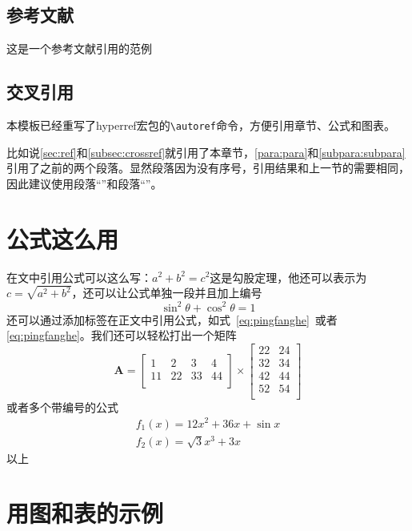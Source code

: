 \documentclass[supercite]{HustGraduPaper}
\begin{document}
\subsection{参考文献}
这是一个参考文献引用的范例\cite{Renzo2019,5502350, liang2019large, CHN_zhou2020, CHN_zhang2017}




\subsection{交叉引用}\label{subsec:crossref}
本模板已经重写了hyperref宏包的\verb|\autoref|命令，方便引用章节、公式和图表。

比如说\autoref{sec:ref}和\autoref{subsec:crossref}就引用了本章节，\autoref{para:para}和\autoref{subpara:subpara}引用了之前的两个段落。显然段落因为没有序号，引用结果和上一节的需要相同，因此建议使用段落“”和段落“”。

\section{公式这么用}
在文中引用公式可以这么写：$a^2+b^2=c^2$这是勾股定理，他还可以表示为$c=\sqrt{a^2+b^2}$，还可以让公式单独一段并且加上编号
\begin{equation}
	\sin^2{\theta}+\cos^2{\theta}=1 \label{eq:pingfanghe}
\end{equation}
还可以通过添加标签在正文中引用公式，如式~\eqref{eq:pingfanghe}~或者\autoref{eq:pingfanghe}。我们还可以轻松打出一个矩阵
\begin{equation}
	\bm{A}=\begin{bmatrix}
		1  & 2  & 3  & 4  \\
		11 & 22 & 33 & 44 \\
	\end{bmatrix}
	\times\begin{bmatrix}
		22 & 24 \\
		32 & 34 \\
		42 & 44 \\
		52 & 54 \\
	\end{bmatrix}
\end{equation}
或者多个带编号的公式
\begin{eqnarray}
	f_1(x)=12x^2+36x+\sin x\\
	f_2(x)=\sqrt{3}{x^3+3x}
\end{eqnarray}
以上

\section{用图和表的示例}
\end{document}
